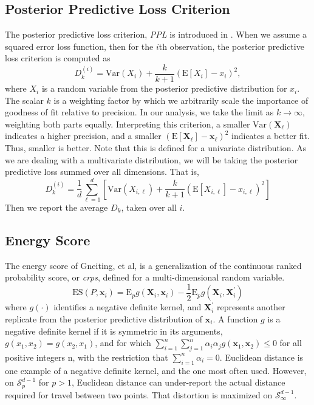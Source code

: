 \subsection{Posterior Predictive Loss Criterion}
The posterior predictive loss criterion, \emph{PPL} is introduced in \cite{gelfand1998}.  When we
  assume a squared error loss function, then for the $i$th observation, the posterior predictive
  loss criterion is computed as
  \begin{equation}
    \label{eq:ppl}
    D_{k}^{(i)} = \text{Var}\left(X_i\right) + \frac{k}{k + 1}\left(\text{E}[X_i] - x_i\right)^2,
  \end{equation}
  where $X_i$ is a random variable from the posterior predictive distribution for $x_i$.  The
  scalar $k$ is a weighting factor by which we arbitrarily scale the importance of goodness of fit
  relative to precision.  In our analysis, we take the limit as $k\to\infty$, weighting both
  parts equally.  Interpreting this criterion, a smaller $\text{Var}(\bm{X}_{\ell})$ indicates a higher
  precision, and a smaller $(\text{E}[\bm{X}_{\ell}] - \bm{x}_{\ell})^2$  indicates a better fit.  Thus,
  smaller is better.  Note that this is defined for a univariate distribution.  As we are dealing
  with a multivariate distribution, we will be taking the posterior predictive loss
  summed over all dimensions.  That is,
  \begin{equation}
    \label{eq:ppl2}
    D_k^{(i)} = \frac{1}{d}\sum_{\ell = 1}^{d}\left[\text{Var}(X_{i,\ell}) +
                  \frac{k}{k+1}\left(\text{E} [X_{i,\ell}] - x_{i,\ell}\right)^2\right]
  \end{equation}
  Then we report the average $D_k$, taken over all $i$.

\subsection{Energy Score}
The energy score of Gneiting, et al\cite{gneiting2007}, is a generalization of the continuous ranked
  probability score, or \emph{crps}, defined for a multi-dimensional random variable.
  \begin{equation}
    \label{eq:es}
    \text{ES}\left(P, \bm{x}_i\right) =  \text{E}_p g\left(\bm{X}_i, \bm{x}_i\right) -
                                    \frac{1}{2}\text{E}_p g\left(\bm{X}_i,\bm{X}_i^{\prime}\right)
  \end{equation}
  where $g(\cdot)$ identifies a negative definite kernel, and $\bm{X}_i^{\prime}$ represents another
  replicate from the posterior predictive distribution of $\bm{x}_i$. A function $g$ is a negative definite kernel if it is symmetric in its arguments, $g(x_1,x_2) = g(x_2,x_1)$, and for which
  $\sum_{i =1}^n\sum_{j=1}^n\alpha_i\alpha_jg(\bm{x}_1,\bm{x}_2) \leq 0$ for all positive integers n, with the
  restriction that $\sum_{i=1}^n\alpha_i = 0$.  Euclidean distance is one example of a negative definite kernel,
  and the one most often used.  However, on $\mathcal{S}_p^{d-1}$ for $p > 1$, Euclidean distance
  can under-report the actual distance required for travel between two points. That distortion is
  maximized on $\mathcal{S}_{\infty}^{d-1}$.

